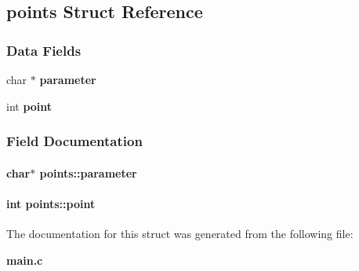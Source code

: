 \subsection{points Struct Reference}
\label{structpoints}
\subsubsection*{Data Fields}
\begin{DoxyCompactItemize}
\item 
char $\ast$ {\bf parameter}
\item 
int {\bf point}
\end{DoxyCompactItemize}


\subsubsection{Field Documentation}
\paragraph[{parameter}]{\setlength{\rightskip}{0pt plus 5cm}char$\ast$ points\+::parameter}\label{structpoints_a006c88452ba4166f7aecf4e7c6d13cb7}
\paragraph[{point}]{\setlength{\rightskip}{0pt plus 5cm}int points\+::point}\label{structpoints_a41c32110b6e598eefc21bf4d775aec85}


The documentation for this struct was generated from the following file\+:\begin{DoxyCompactItemize}
\item 
{\bf main.\+c}\end{DoxyCompactItemize}

